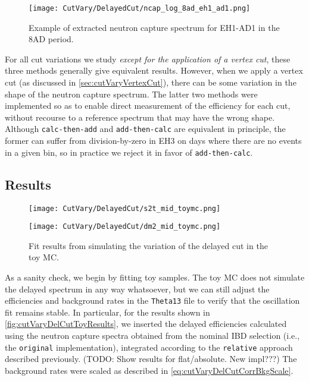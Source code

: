 \documentclass[../thesis.tex]{subfiles}
\begin{document}
\begin{figure}[ht]
  \texttt{[image: CutVary/DelayedCut/ncap\_log\_8ad\_eh1\_ad1.png]}
  \caption{Example of extracted neutron capture spectrum for EH1-AD1 in the 8AD period.}
  \label{fig:cutVaryDelCutNcapExample}
\end{figure}

For all cut variations we study \emph{except for the application of a vertex cut}, these three methods generally give equivalent results. However, when we apply a vertex cut (as discussed in \autoref{sec:cutVaryVertexCut}), there can be some variation in the shape of the neutron capture spectrum. The latter two methods were implemented so as to enable direct measurement of the efficiency for each cut, without recourse to a reference spectrum that may have the wrong shape. Although \texttt{calc-then-add} and \texttt{add-then-calc} are equivalent in principle, the former can suffer from division-by-zero in EH3 on days where there are no events in a given bin, so in practice we reject it in favor of \texttt{add-then-calc}.

\begin{comment}
In most of the results that follow, we show the outcome of using the \texttt{original} method, but the other methods give the same results. When we later discuss the application of vertex cuts, we will switch to the \texttt{add-then-calc} method (and will show the difficulties that result when attempting to use the \texttt{original} method).
\end{comment}

\subsection{Results}
\label{sec:cutVaryDelCutResults}

\begin{figure}[ht]
  \begin{minipage}{0.5\linewidth}%
    \texttt{[image: CutVary/DelayedCut/s2t\_mid\_toymc.png]}%
  \end{minipage}%
  \begin{minipage}{0.5\linewidth}%
    \texttt{[image: CutVary/DelayedCut/dm2\_mid\_toymc.png]}%
  \end{minipage}%
  \caption{Fit results from simulating the variation of the delayed cut in the toy MC.}
  \label{fig:cutVaryDelCutToyResults}
\end{figure}

As a sanity check, we begin by fitting toy samples. The toy MC does not simulate the delayed spectrum in any way whatsoever, but we can still adjust the efficiencies and background rates in the \texttt{Theta13} file to verify that the oscillation fit remains stable. In particular, for the results shown in \autoref{fig:cutVaryDelCutToyResults}, we inserted the delayed efficiencies calculated using the neutron capture spectra obtained from the nominal IBD selection (i.e., the \texttt{original} implementation), integrated according to the \texttt{relative} approach described previously. (TODO: Show results for flat/absolute. New impl???) The background rates were scaled as described in \autoref{eq:cutVaryDelCutCorrBkgScale}.
\end{document}
